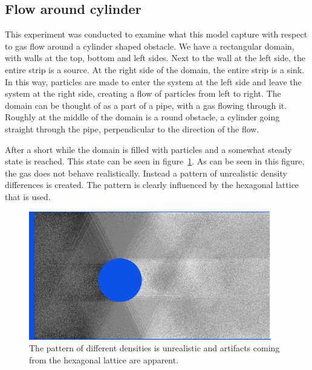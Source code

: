 \documentclass[12pt,a4paper]{article}
\begin{document}
\subsection{Flow around cylinder}
This experiment was conducted to examine what this model capture with respect to gas flow around a cylinder shaped obstacle. We have a rectangular domain, with walls at the top, bottom and left sides. Next to the wall at the left side, the entire strip is a source. At the right side of the domain, the entire strip is a sink. In this way, particles are made to enter the system at the left side and leave the system at the right side, creating a flow of particles from left to right. The domain can be thought of as a part of a pipe, with a gas flowing through it. Roughly at the middle of the domain is a round obstacle, a cylinder going straight through the pipe, perpendicular to the direction of the flow.

After a short while the domain is filled with particles and a somewhat steady state is reached. This state can be seen in figure~\ref{flow1}. As can be seen in this figure, the gas does not behave realistically. Instead a pattern of unrealistic density differences is created. The pattern is clearly influenced by the hexagonal lattice that is used.
\begin{figure}[htp]
\centering
  \includegraphics[width=300pt]{figs/scenario3mathexprintscreen1.png}
\caption{The pattern of different densities is unrealistic and artifacts coming from the hexagonal lattice are apparent.}
\label{flow1}
\end{figure}
\end{document}
